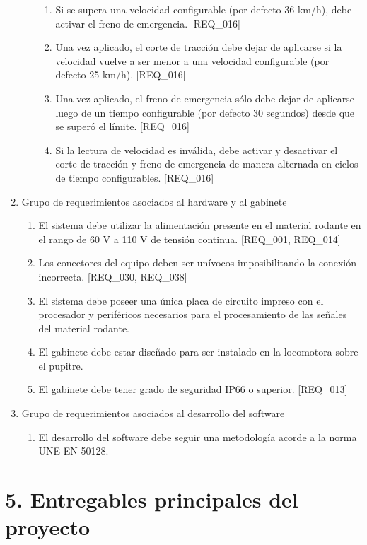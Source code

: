 \documentclass[11pt]{charter}
\begin{document}
\begin{enumerate}
\begin{enumerate}
\begin{enumerate}
    \item Si se supera una velocidad configurable (por defecto 36 km/h), debe activar el freno de emergencia. [REQ\_016]
    \item Una vez aplicado, el corte de tracción debe dejar de aplicarse si la velocidad vuelve a ser menor a una velocidad configurable (por defecto 25 km/h). [REQ\_016]
    \item Una vez aplicado, el freno de emergencia sólo debe dejar de aplicarse luego de un tiempo configurable (por defecto 30 segundos) desde que se superó el límite. [REQ\_016]
    \item Si la lectura de velocidad es inválida, debe activar y desactivar el corte de tracción y freno de emergencia de manera alternada en ciclos de tiempo configurables. [REQ\_016]
    \end{enumerate}
  \end{enumerate}
\item Grupo de requerimientos asociados al hardware y al gabinete
  \begin{enumerate}
    \item El sistema debe utilizar la alimentación presente en el material rodante en el rango de 60 V a 110 V de tensión continua. [REQ\_001, REQ\_014]
    \item Los conectores del equipo deben ser unívocos imposibilitando la conexión incorrecta. [REQ\_030, REQ\_038]
    \item El sistema debe poseer una única placa de circuito impreso con el procesador y periféricos necesarios para el procesamiento de las señales del material rodante.
    \item El gabinete debe estar diseñado para ser instalado en la locomotora sobre el pupitre.
    \item El gabinete debe tener grado de seguridad IP66 o superior. [REQ\_013]
  \end{enumerate}
\item Grupo de requerimientos asociados al desarrollo del software
  \begin{enumerate}
    \item El desarrollo del software debe seguir una metodología acorde a la norma UNE-EN 50128.
  \end{enumerate}
\end{enumerate}

\section{5. Entregables principales del proyecto}
\label{sec:entregables}
\end{document}
